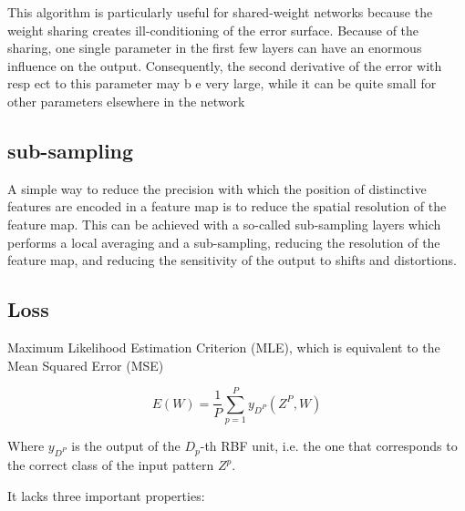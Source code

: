 \documentclass[11pt]{article}
\begin{document}
This algorithm is particularly useful for shared-weight networks because the weight sharing creates ill-conditioning of the error surface. Because of the sharing, one single parameter in the first few layers can have an enormous influence on the output. Consequently, the second derivative of the error with resp ect to this parameter may b e very large, while it can be quite small for other parameters elsewhere in the network

\subsection{sub-sampling}

A simple way to reduce the precision with which the position of distinctive features are encoded in a feature map is to reduce the spatial resolution of the feature map. This can be achieved
with a so-called sub-sampling layers which performs a local
averaging and a sub-sampling, reducing the resolution of
the feature map, and reducing the sensitivity of the output
to shifts and distortions.

\subsection{Loss}

Maximum Likelihood Estimation Criterion (MLE), which is equivalent to the Mean Squared Error (MSE)

\begin{equation*}
    E(W) = \frac 1 P \sum ^ P _{ p = 1} y_{D^P} (Z^P, W)
\end{equation*}

Where $y_{D^P}$ is the output of the $D_p$-th RBF unit, i.e. the one that corresponds to the correct class of the input pattern $Z^p$. 

It lacks three important properties:
\end{document}
